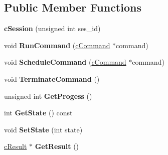 \subsection*{\-Public \-Member \-Functions}
\begin{DoxyCompactItemize}
\item 
\hypertarget{classengine_1_1cSession_aafe0e5fd946fd5fa5b990617f848a5a5}{
{\bfseries c\-Session} (unsigned int ses\-\_\-id)}
\label{classengine_1_1cSession_aafe0e5fd946fd5fa5b990617f848a5a5}

\item 
\hypertarget{classengine_1_1cSession_a79226f269db0a276764656791d7689f2}{
void {\bfseries \-Run\-Command} (\hyperlink{classengine_1_1cCommand}{c\-Command} $\ast$command)}
\label{classengine_1_1cSession_a79226f269db0a276764656791d7689f2}

\item 
\hypertarget{classengine_1_1cSession_afcf61cec37829291b2aa8e13d2ca96e0}{
void {\bfseries \-Schedule\-Command} (\hyperlink{classengine_1_1cCommand}{c\-Command} $\ast$command)}
\label{classengine_1_1cSession_afcf61cec37829291b2aa8e13d2ca96e0}

\item 
\hypertarget{classengine_1_1cSession_af1a1747cd7020bd4bfce782bf1ffec5d}{
void {\bfseries \-Terminate\-Command} ()}
\label{classengine_1_1cSession_af1a1747cd7020bd4bfce782bf1ffec5d}

\item 
\hypertarget{classengine_1_1cSession_ab5b73d57f8d6fd918d33b4e0a64c21d9}{
unsigned int {\bfseries \-Get\-Progess} ()}
\label{classengine_1_1cSession_ab5b73d57f8d6fd918d33b4e0a64c21d9}

\item 
\hypertarget{classengine_1_1cSession_a4d5cfbd1a1a5d1ff022fd4915b256f4f}{
int {\bfseries \-Get\-State} () const }
\label{classengine_1_1cSession_a4d5cfbd1a1a5d1ff022fd4915b256f4f}

\item 
\hypertarget{classengine_1_1cSession_ac70dfa95b25fed14a6ca32df68cf1300}{
void {\bfseries \-Set\-State} (int state)}
\label{classengine_1_1cSession_ac70dfa95b25fed14a6ca32df68cf1300}

\item 
\hypertarget{classengine_1_1cSession_aa403617485890fe288c5cf68b39ab540}{
\hyperlink{classengine_1_1cResult}{c\-Result} $\ast$ {\bfseries \-Get\-Result} ()}
\label{classengine_1_1cSession_aa403617485890fe288c5cf68b39ab540}

\end{DoxyCompactItemize}
